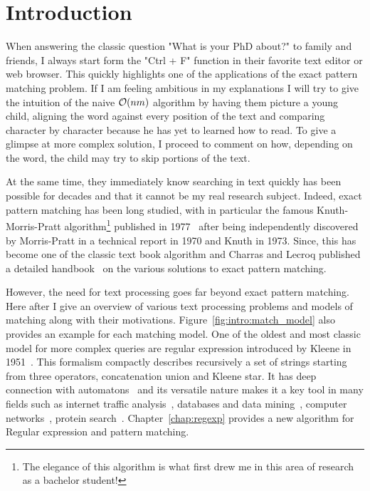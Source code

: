 \chapter*{Introduction}\label{chap:intro}

When answering the classic question "What is your PhD about?" to family and friends, I always start form the "Ctrl + F" function in their favorite text editor or web browser. This quickly highlights one of the applications of the exact pattern matching problem. If I am feeling ambitious in my explanations I will try to give the intuition of the naive $\mathcal{O}(nm)$ algorithm by having them picture a young child, aligning the word against every position of the text and comparing character by character because he has yet to learned how to read. To give a glimpse at more complex solution, I proceed to comment on how, depending on the word, the child may try to skip portions of the text.

At the same time, they immediately know searching in text quickly has been possible for decades and that it cannot be my real research subject. Indeed, exact pattern matching has been long studied, with in particular the famous Knuth-Morris-Pratt algorithm\footnote{The elegance of this algorithm is what first drew me in this area of research as a bachelor student!} published in 1977~\cite{KMP} after being independently discovered by Morris-Pratt in a technical report in 1970 and Knuth in 1973. Since, this has become one of the classic text book algorithm and Charras and Lecroq published a detailed handbook~\cite{charras2004handbook} on the various solutions to exact pattern matching.



However, the need for text processing goes far beyond exact pattern matching. Here after I give an overview of various text processing problems and models of matching along with their motivations. Figure~\ref{fig:intro:match_model} also provides an example for each matching model.
One of the oldest and most classic model for more complex queries are regular expression introduced by Kleene in 1951~\cite{RM-704}.
This formalism compactly describes recursively a set of strings starting from three operators, concatenation union and Kleene star.
It has deep connection with automatons~\cite{Thompson_automaton} and its versatile nature makes it a key tool in many fields such as internet traffic analysis~\cite{4221791,4579527}, databases and data mining~\cite{1000341,10.5555/645927.672035,10.1145/375551.375569}, computer networks~\cite{10.1145/1159913.1159952}, protein search~\cite{10.1145/369133.369220}. Chapter~\ref{chap:regexp} provides a new algorithm for Regular expression and pattern matching.

